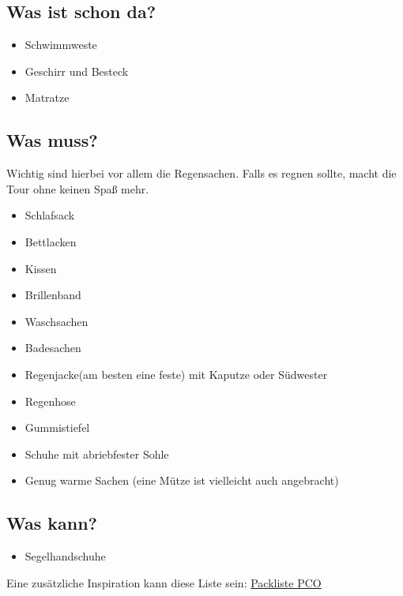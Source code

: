 \documentclass[12pt]{article}
\begin{document}
\subsection*{Was ist schon da?}
\begin{itemize}
\renewcommand{\labelitemi}{$\boxempty$}
\item Schwimmweste
\item Geschirr und Besteck
\item Matratze
\end{itemize}

\subsection*{Was muss?}
Wichtig sind hierbei vor allem die Regensachen. Falls es regnen sollte, macht die Tour ohne keinen Spaß mehr.
\begin{itemize}
\renewcommand{\labelitemi}{$\boxempty$}
\item Schlafsack
\item Bettlacken
\item Kissen
\item Brillenband
\item Waschsachen
\item Badesachen
\item Regenjacke(am besten eine feste) mit Kaputze oder Südwester
\item Regenhose
\item Gummistiefel
\item Schuhe mit abriebfester Sohle
\item Genug warme Sachen (eine Mütze ist vielleicht auch angebracht)
\end{itemize}

\subsection*{Was kann?}
\begin{itemize}
\renewcommand{\labelitemi}{$\boxempty$}
\item Segelhandschuhe

\end{itemize}

Eine zusätzliche Inspiration kann diese Liste sein: \href{http://www.pc-ostsee.de/yachtcharter/sites/download/Packliste.pdf}{Packliste PCO}

\end{document}
